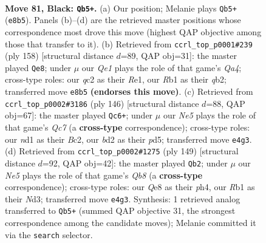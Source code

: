 \documentclass[11pt]{article}
\begin{document}
\clearpage

\begin{figure}[p]\centering
\begin{subfigure}{0.46\textwidth}\centering
\resizebox{\linewidth}{!}{%
\newchessgame
\chessboard[
  setfen={4q3/6k1/8/P1p2p2/3pnPpb/4P3/R1QB4/1r1N1K2 b - - 6 81},
  showmover=false,
  pgfstyle=straightmove, color=movearrow, markmove={e8-b5}
]}
\caption{}
\end{subfigure}\hfill
\begin{subfigure}{0.46\textwidth}\centering
\resizebox{\linewidth}{!}{%
\newchessgame
\chessboard[
  setfen={1bb5/6k1/5p2/3pp2p/Q2N3P/P1P3P1/1q6/4R2K w - - 0 80},
  showmover=false,
  pgfstyle=straightmove, color=movearrow, markmove={a4-e8}
]}
\caption{}
\end{subfigure}
\\[4pt]
\begin{subfigure}{0.46\textwidth}\centering
\resizebox{\linewidth}{!}{%
\newchessgame
\chessboard[
  setfen={4kb1R/2Q5/p3pq1p/3p2pP/3P2P1/8/K1B2r2/8 w - - 18 74},
  showmover=false,
  pgfstyle=straightmove, color=movearrow, markmove={c7-c6}
]}
\caption{}
\end{subfigure}\hfill
\begin{subfigure}{0.46\textwidth}\centering
\resizebox{\linewidth}{!}{%
\newchessgame
\chessboard[
  setfen={6k1/2b3p1/8/2p1P3/2Pp3P/3n1NP1/4Q1K1/1q2B3 b - - 0 75},
  showmover=false,
  pgfstyle=straightmove, color=movearrow, markmove={b1-b2}
]}
\caption{}
\end{subfigure}
\caption{\textbf{Move 81, Black: \texttt{Qb5+}.} (a) Our position; Melanie plays \texttt{Qb5+} (\texttt{e8b5}). Panels (b)--(d) are the retrieved master positions whose correspondence most drove this move (highest QAP objective among those that transfer to it). (b) Retrieved from \texttt{ccrl\_top\_p0001\#239} (ply 158) [structural distance $d$=89, QAP obj=31]: the master played \texttt{Qe8}; under $\mu$ our \emph{Qe1} plays the role of that game's \emph{Qa4}; cross-type roles: our \emph{q}c2 as their \emph{R}e1, our \emph{R}b1 as their \emph{q}b2; transferred move \texttt{e8b5} \textbf{(endorses this move)}. (c) Retrieved from \texttt{ccrl\_top\_p0002\#3186} (ply 146) [structural distance $d$=88, QAP obj=67]: the master played \texttt{Qc6+}; under $\mu$ our \emph{Ne5} plays the role of that game's \emph{Qc7} (a \textbf{cross-type} correspondence); cross-type roles: our \emph{n}d1 as their \emph{B}c2, our \emph{b}d2 as their \emph{p}d5; transferred move \texttt{e4g3}. (d) Retrieved from \texttt{ccrl\_top\_p0002\#1275} (ply 149) [structural distance $d$=92, QAP obj=42]: the master played \texttt{Qb2}; under $\mu$ our \emph{Ne5} plays the role of that game's \emph{Qb8} (a \textbf{cross-type} correspondence); cross-type roles: our \emph{Q}e8 as their \emph{p}h4, our \emph{R}b1 as their \emph{N}d3; transferred move \texttt{e4g3}. Synthesis: 1 retrieved analog transferred to \texttt{Qb5+} (summed QAP objective 31, the strongest correspondence among the candidate moves); Melanie committed it via the \texttt{search} selector.}
\label{fig:thought-m161}
\end{figure}
\end{document}
